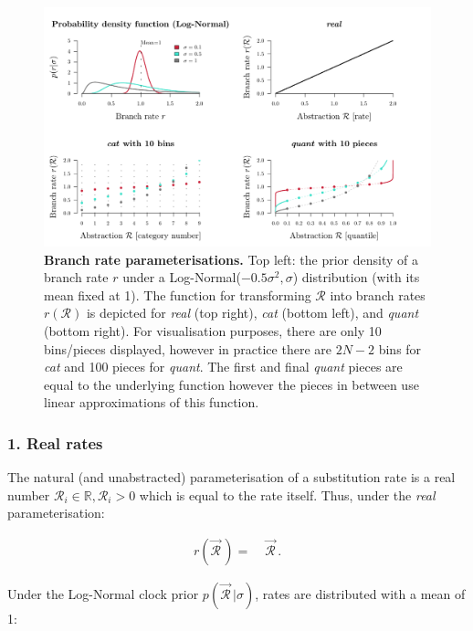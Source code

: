 \documentclass[10pt,letterpaper]{article}
\begin{document}
\begin{figure}[!h]
\includegraphics[width=\textwidth]{Figures/rateparameterisation.pdf}
\caption{\textbf{Branch rate parameterisations.} Top left: the prior density of a branch rate $r$ under a Log-Normal($-0.5\sigma^2, \sigma$) distribution (with its mean fixed at 1). 
The function for transforming $\mathcal{R}$ into branch rates $r(\mathcal{R})$ is depicted for \textit{real} (top right), \textit{cat} (bottom left), and \textit{quant} (bottom right).
For visualisation purposes, there are only 10 bins/pieces displayed, however in practice there are $2N-2$ bins for \textit{cat} and 100 pieces for \textit{quant}.
The first and final \textit{quant} pieces are equal to the underlying function however the pieces in between use linear approximations of this function. }
\label{fig:rateparams}
\end{figure}



\clearpage
\subsubsection*{1. Real rates}
The natural (and unabstracted) parameterisation of a substitution rate is a real number $\mathcal{R}_i \in \mathbb{R}, \mathcal{R}_i > 0$ which is equal to the rate itself. Thus, under the \textit{real} parameterisation:

\begin{align}
r(\vec{\mathcal{R}}^{\,}) =& \; \vec{\mathcal{R}}^{\,}.
\end{align}


Under the Log-Normal clock prior $p(\vec{\mathcal{R}}^{\,} | \sigma)$, rates are distributed with a mean of 1:
\end{document}
